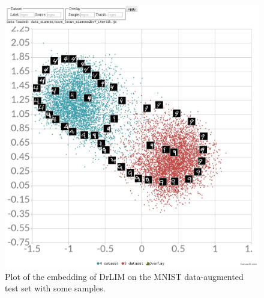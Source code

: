\documentclass[a4paper,12pt]{report}
\begin{document}
\begin{figure}[t]
    \centering
    \includegraphics{thesis_figures/mnist_cl_drlim.jpg}
    \caption{Plot of the embedding of DrLIM on the MNIST data-augmented test set with some samples.}
    \label{fig:mnist_cl_drlim}
\end{figure}
\end{document}
